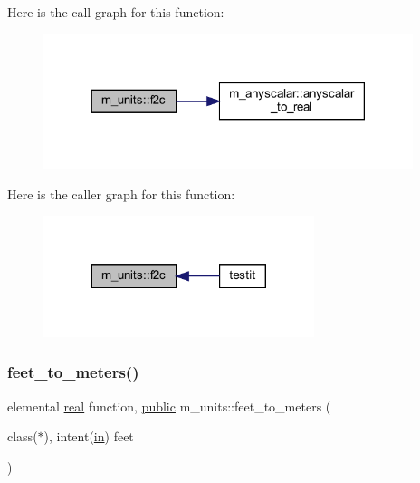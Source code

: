 Here is the call graph for this function\+:
\nopagebreak
\begin{figure}[H]
\begin{center}
\leavevmode
\includegraphics[width=306pt]{namespacem__units_a8f71442bfefc89e6e4636f3a4677b796_cgraph}
\end{center}
\end{figure}
Here is the caller graph for this function\+:
\nopagebreak
\begin{figure}[H]
\begin{center}
\leavevmode
\includegraphics[width=224pt]{namespacem__units_a8f71442bfefc89e6e4636f3a4677b796_icgraph}
\end{center}
\end{figure}
\mbox{\label{namespacem__units_a6b2e3302766d3ee6edbb2d6d3c284e96}} 
\subsubsection{\texorpdfstring{feet\+\_\+to\+\_\+meters()}{feet\_to\_meters()}}
{\footnotesize\ttfamily elemental \hyperlink{read__watch_83_8txt_abdb62bde002f38ef75f810d3a905a823}{real} function, \hyperlink{M__stopwatch_83_8txt_a2f74811300c361e53b430611a7d1769f}{public} m\+\_\+units\+::feet\+\_\+to\+\_\+meters (\begin{DoxyParamCaption}\item[{class($\ast$), intent(\hyperlink{M__journal_83_8txt_afce72651d1eed785a2132bee863b2f38}{in})}]{feet }\end{DoxyParamCaption})}



